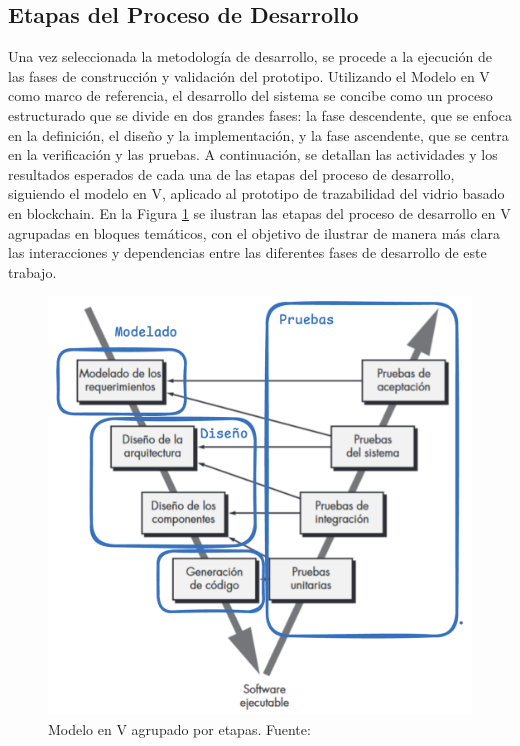 \subsection{Etapas del Proceso de Desarrollo}

Una vez seleccionada la metodología de desarrollo, se procede a la ejecución de las fases de construcción y validación del prototipo. Utilizando el Modelo en V como marco de referencia, el desarrollo del sistema se concibe como un proceso estructurado que se divide en dos grandes fases: la fase descendente, que se enfoca en la definición, el diseño y la implementación, y la fase ascendente, que se centra en la verificación y las pruebas. A continuación, se detallan las actividades y los resultados esperados de cada una de las etapas del proceso de desarrollo, siguiendo el modelo en V, aplicado al prototipo de trazabilidad del vidrio basado en blockchain. En la Figura \ref{fig:methodology-v-grouped} se ilustran las etapas del proceso de desarrollo en V agrupadas en bloques temáticos, con el objetivo de ilustrar de manera más clara las interacciones y dependencias entre las diferentes fases de desarrollo de este trabajo.

\begin{figure}[!htb]
	\centering
	\includegraphics[width=\linewidth]{Figures/model-v-grouped.png}
	\caption{Modelo en V agrupado por etapas. Fuente: \cite{pressman2010ingenieria}}
    \label{fig:methodology-v-grouped}
\end{figure}


